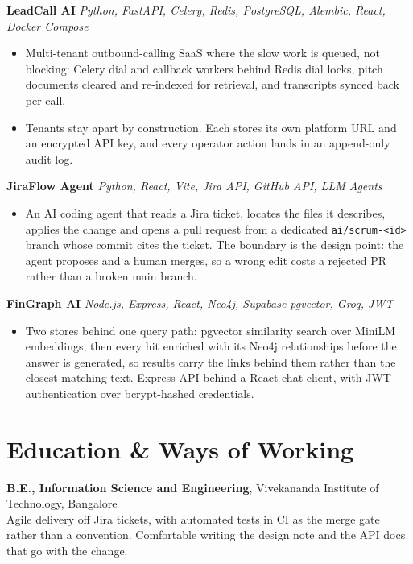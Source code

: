 \documentclass[10pt,a4paper]{article}
\begin{document}
\vspace{1pt}
\textbf{LeadCall AI} \textit{Python, FastAPI, Celery, Redis, PostgreSQL, Alembic, React, Docker Compose}
\begin{itemize}
  \item Multi-tenant outbound-calling SaaS where the slow work is queued, not blocking: Celery dial
        and callback workers behind Redis dial locks, pitch documents cleared and re-indexed for
        retrieval, and transcripts synced back per call.
  \item Tenants stay apart by construction. Each stores its own platform URL and an encrypted API key,
        and every operator action lands in an append-only audit log.
\end{itemize}

\vspace{1pt}
\textbf{JiraFlow Agent} \textit{Python, React, Vite, Jira API, GitHub API, LLM Agents}
\begin{itemize}
  \item An AI coding agent that reads a Jira ticket, locates the files it describes, applies the change
        and opens a pull request from a dedicated \texttt{ai/scrum-<id>} branch whose commit cites the
        ticket. The boundary is the design point: the agent proposes and a human merges, so a wrong
        edit costs a rejected PR rather than a broken main branch.
\end{itemize}

\vspace{1pt}
\textbf{FinGraph AI} \textit{Node.js, Express, React, Neo4j, Supabase pgvector, Groq, JWT}
\begin{itemize}
  \item Two stores behind one query path: pgvector similarity search over MiniLM embeddings, then every
        hit enriched with its Neo4j relationships before the answer is generated, so results carry the
        links behind them rather than the closest matching text. Express API behind a React chat
        client, with JWT authentication over bcrypt-hashed credentials.
\end{itemize}

\section{Education \& Ways of Working}
\textbf{B.E., Information Science and Engineering}, Vivekananda Institute of Technology, Bangalore\\
Agile delivery off Jira tickets, with automated tests in CI as the merge gate rather than a
convention. Comfortable writing the design note and the API docs that go with the change.
\end{document}
